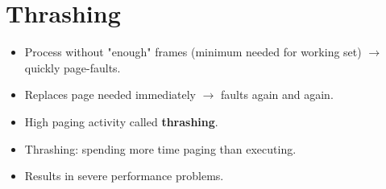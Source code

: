 \section{Thrashing}
\begin{itemize}
    \item Process without "enough" frames (minimum needed for working set) $\rightarrow$ quickly page-faults.
    \item Replaces page needed immediately $\rightarrow$ faults again and again.
    \item High paging activity called \textbf{thrashing}.
    \item Thrashing: spending more time paging than executing.
    \item Results in severe performance problems.
\end{itemize}

